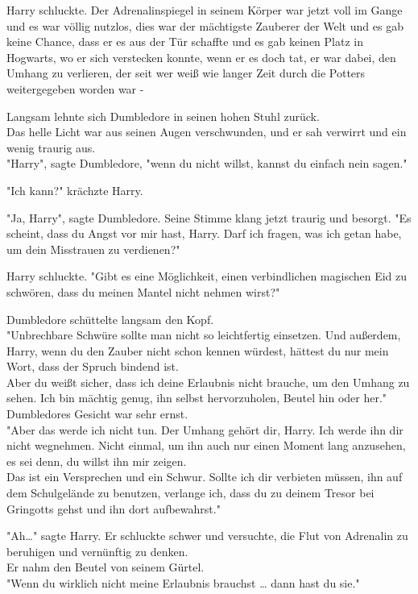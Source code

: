 {Harry schluckte. Der Adrenalinspiegel in seinem Körper war jetzt voll im Gange und es war völlig nutzlos, dies war der mächtigste Zauberer der Welt und es gab keine Chance, dass er es aus der Tür schaffte und es gab keinen Platz in Hogwarts, wo er sich verstecken konnte, wenn er es doch tat, er war dabei, den Umhang zu verlieren, der seit wer weiß wie langer Zeit durch die Potters weitergegeben worden war -

Langsam lehnte sich Dumbledore in seinen hohen Stuhl zurück.\\ Das helle Licht war aus seinen Augen verschwunden, und er sah verwirrt und ein wenig traurig aus.\\ "Harry", sagte Dumbledore, "wenn du nicht willst, kannst du einfach nein sagen."

"Ich kann?" krächzte Harry.

"Ja, Harry", sagte Dumbledore. Seine Stimme klang jetzt traurig und besorgt. "Es scheint, dass du Angst vor mir hast, Harry. Darf ich fragen, was ich getan habe, um dein Misstrauen zu verdienen?"

Harry schluckte. "Gibt es eine Möglichkeit, einen verbindlichen magischen Eid zu schwören, dass du meinen Mantel nicht nehmen wirst?"

Dumbledore schüttelte langsam den Kopf.\\ "Unbrechbare Schwüre sollte man nicht so leichtfertig einsetzen. Und außerdem, Harry, wenn du den Zauber nicht schon kennen würdest, hättest du nur mein Wort, dass der Spruch bindend ist.\\ Aber du weißt sicher, dass ich deine Erlaubnis nicht brauche, um den Umhang zu sehen. Ich bin mächtig genug, ihn selbst hervorzuholen, Beutel hin oder her."\\ Dumbledores Gesicht war sehr ernst.\\ "Aber das werde ich nicht tun. Der Umhang gehört dir, Harry. Ich werde ihn dir nicht wegnehmen. Nicht einmal, um ihn auch nur einen Moment lang anzusehen, es sei denn, du willst ihn mir zeigen.\\ Das ist ein Versprechen und ein Schwur. Sollte ich dir verbieten müssen, ihn auf dem Schulgelände zu benutzen, verlange ich, dass du zu deinem Tresor bei Gringotts gehst und ihn dort aufbewahrst."

"Ah…" sagte Harry. Er schluckte schwer und versuchte, die Flut von Adrenalin zu beruhigen und vernünftig zu denken.\\ Er nahm den Beutel von seinem Gürtel.\\ "Wenn du wirklich nicht meine Erlaubnis brauchst … dann hast du sie."

}
